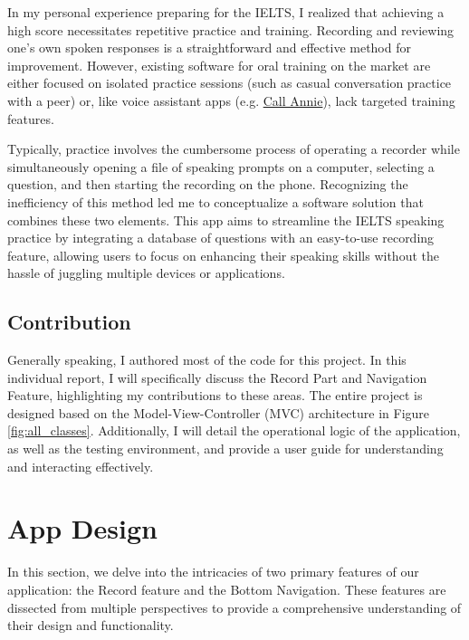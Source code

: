\documentclass[conference,10pt,letterpaper]{IEEEtran}
\begin{document}
	In my personal experience preparing for the IELTS, I realized that achieving a high score necessitates repetitive practice and training. Recording and reviewing one's own spoken responses is a straightforward and effective method for improvement. However, existing software for oral training on the market are either focused on isolated practice sessions (such as casual conversation practice with a peer) or, like voice assistant apps (e.g. \href{https://callannie.ai/}{Call Annie}), lack targeted training features.
	
	Typically, practice involves the cumbersome process of operating a recorder while simultaneously opening a file of speaking prompts on a computer, selecting a question, and then starting the recording on the phone. Recognizing the inefficiency of this method led me to conceptualize a software solution that combines these two elements. This app aims to streamline the IELTS speaking practice by integrating a database of questions with an easy-to-use recording feature, allowing users to focus on enhancing their speaking skills without the hassle of juggling multiple devices or applications.
	
	\subsection{Contribution}
	Generally speaking, I authored most of the code for this project. In this individual report, I will specifically discuss the Record Part and Navigation Feature, highlighting my contributions to these areas. The entire project is designed based on the Model-View-Controller (MVC) architecture in Figure \ref{fig:all_classes}. Additionally, I will detail the operational logic of the application, as well as the testing environment, and provide a user guide for understanding and interacting effectively.
	
	\newpage
	\section{App Design}
	
	In this section, we delve into the intricacies of two primary features of our application: the Record feature and the Bottom Navigation. These features are dissected from multiple perspectives to provide a comprehensive understanding of their design and functionality.
	
\end{document}
